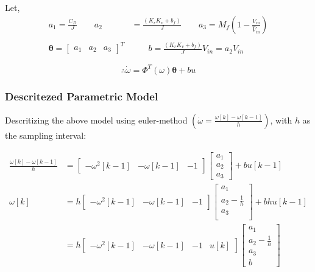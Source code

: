 Let,
\begin{align*}
    a_1 = \frac{C_{D}}{J}  \qquad
    a_2 &= \frac{(K_rK_v + b_f)}{J} \qquad
    a_3 =   M_f \left( 1 - \frac{V_{in}}{\hat V_{in}}\right)\\
    \\
    \pmb \theta = \begin{bmatrix}a_1 & a_2 & a_3 \end{bmatrix}^T &\qquad
    b = \frac{(K_rK_v + b_f)}{J} V_{in} = a_2 V_{in}
\end{align*}

$$\therefore \dot \omega = \Phi^T(\omega) \pmb \theta + b u$$

\subsubsection{Descritezed Parametric Model}
Descritizing the above model using euler-method $\left(\dot \omega = \frac{\omega[k] - \omega[k-1]}{h}\right)$, with $h$ as the sampling interval:

\begin{align*}
    \frac{\omega[k] - \omega[k-1]}{h} &=
    \begin{bmatrix} - \omega^2[k-1] & - \omega[k-1]  &  -1 \end{bmatrix}
    \begin{bmatrix}
        a_1 \\ a_2 \\ a_3
    \end{bmatrix}
    + bu[k-1]\\
    \omega[k] &= h \begin{bmatrix} - \omega^2[k-1] & - \omega[k-1]  & -1 \end{bmatrix}
    \begin{bmatrix}
        a_1 \\
        a_2 - \frac{1}{h} \\
        a_3 \\
    \end{bmatrix}
    + b  h u[k-1]\\
    &= h \begin{bmatrix} - \omega^2[k-1] & -\omega[k-1] & -1 & u[k] \end{bmatrix}
    \begin{bmatrix}
        a_1 \\
        a_2 - \frac{1}{h} \\
        a_3 \\
        b
    \end{bmatrix}
\end{align*}

